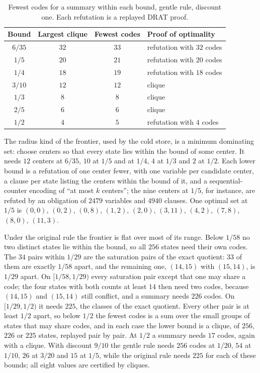 \documentclass[11pt]{article}
\theoremstyle{definition}
\theoremstyle{plain}
\begin{document}
\begin{table}[ht]
\centering\small
\begin{tabular}{cccl}
\toprule
Bound & Largest clique & Fewest codes & Proof of optimality\\
\midrule
$6/35$ & $32$ & $33$ & refutation with $32$ codes\\
$1/5$ & $20$ & $21$ & refutation with $20$ codes\\
$1/4$ & $18$ & $19$ & refutation with $18$ codes\\
$3/10$ & $12$ & $12$ & clique\\
$1/3$ & $8$ & $8$ & clique\\
$2/5$ & $6$ & $6$ & clique\\
$1/2$ & $4$ & $5$ & refutation with $4$ codes\\
\bottomrule
\end{tabular}
\caption{Fewest codes for a summary within each bound, gentle rule, discount one. Each refutation is a
replayed DRAT proof.}\label{tab:ex1frontier}
\end{table}

The radius kind of the frontier, used by the cold store, is a minimum dominating set: choose centers
so that every state lies within the bound of some center. It needs $12$ centers at $6/35$, $10$ at
$1/5$ and at $1/4$, $4$ at $1/3$ and $2$ at $1/2$. Each lower bound is a refutation of one center
fewer, with one variable per candidate center, a clause per state listing the centers within the
bound of it, and a sequential-counter encoding of ``at most $k$ centers''; the nine centers at $1/5$,
for instance, are refuted by an obligation of $2479$ variables and $4940$ clauses. One optimal set
at $1/5$ is $(0,0)$, $(0,2)$, $(0,8)$, $(1,2)$, $(2,0)$, $(3,11)$, $(4,2)$, $(7,8)$, $(8,0)$,
$(11,3)$.

Under the original rule the frontier is flat over most of its range. Below $1/58$ no two distinct
states lie within the bound, so all $256$ states need their own codes. The $34$ pairs within $1/29$
are the saturation pairs of the exact quotient: $33$ of them are exactly $1/58$ apart, and the
remaining one, $(14,15)$ with $(15,14)$, is $1/29$ apart. On $[1/58,1/29)$ every saturation pair
except that one may share a code; the four states with both counts at least $14$ then need two codes,
because $(14,15)$ and $(15,14)$ still conflict, and a summary needs $226$ codes. On $[1/29,1/2)$ it
needs $225$, the classes of the exact quotient. Every other pair is at least $1/2$ apart, so below
$1/2$ the fewest codes is a sum over the small groups of states that may share codes, and in each case
the lower bound is a clique, of $256$, $226$ or $225$ states, replayed pair by pair. At $1/2$ a summary
needs $17$ codes, again with a clique. With discount $9/10$ the gentle rule needs $256$ codes at
$1/20$, $54$ at $1/10$, $26$ at $3/20$ and $15$ at $1/5$, while the original rule needs $225$ for
each of these bounds; all eight values are certified by cliques.
\end{document}
